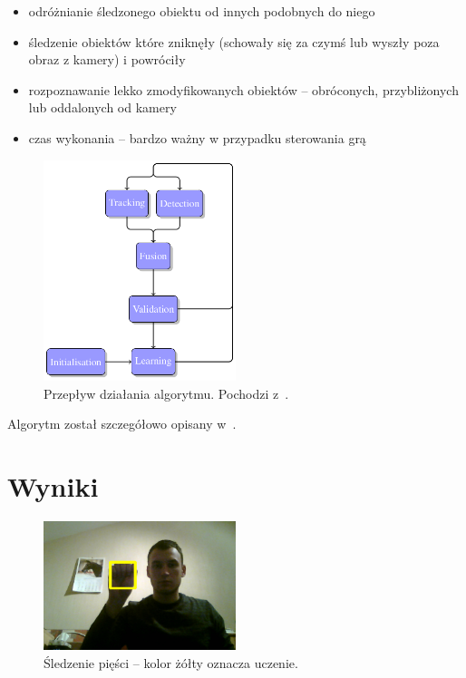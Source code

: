 \documentclass{article}
\newenvironment{tightlist}{
\begin{itemize}
  \setlength{\itemsep}{1pt}
  \setlength{\parskip}{0pt}
  \setlength{\parsep}{0pt}}
{\end{itemize}}
\begin{document}
\begin{tightlist}
\item odróżnianie śledzonego obiektu od innych podobnych do niego
\item śledzenie obiektów które zniknęły (schowały się za czymś lub wyszły poza obraz z kamery) i powróciły
\item rozpoznawanie lekko zmodyfikowanych obiektów -- obróconych, przybliżonych lub oddalonych od kamery
\item czas wykonania -- bardzo ważny w przypadku sterowania grą
\end{tightlist}

\begin{figure}[!ht]
\centering
\includegraphics[width=0.5\textwidth]{alg_flow.png}
\caption{Przepływ działania algorytmu. Pochodzi z~\cite{TDL-thesis}.}
\label{fig:flow}
\end{figure}

Algorytm został szczegółowo opisany w~\cite{TDL-thesis}.

\section{Wyniki} \label{results}

\begin{figure}[!ht]
\centering
\includegraphics[width=0.5\textwidth]{fist-yellow.png}
\caption{Śledzenie pięści -- kolor żółty oznacza uczenie.}
\label{fig:fist-yellow}
\end{figure}
\end{document}
